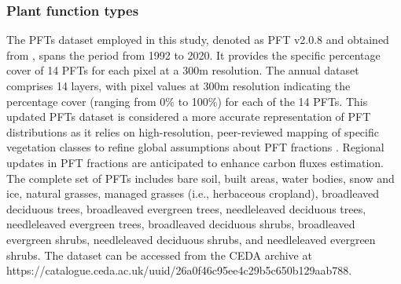 \subsubsection*{Plant function types}
The PFTs dataset employed in this study, denoted as PFT v2.0.8 and obtained from \citep{harper202229}, spans the period from 1992 to 2020. It provides the specific percentage cover of 14 PFTs for each pixel at a 300m resolution. The annual dataset comprises 14 layers, with pixel values at 300m resolution indicating the percentage cover (ranging from 0\% to 100\%) for each of the 14 PFTs. This updated PFTs dataset is considered a more accurate representation of PFT distributions as it relies on high-resolution, peer-reviewed mapping of specific vegetation classes to refine global assumptions about PFT fractions \citep{harper202229}. Regional updates in PFT fractions are anticipated to enhance carbon fluxes estimation. The complete set of PFTs includes bare soil, built areas, water bodies, snow and ice, natural grasses, managed grasses (i.e., herbaceous cropland), broadleaved deciduous trees, broadleaved evergreen trees, needleleaved deciduous trees, needleleaved evergreen trees, broadleaved deciduous shrubs, broadleaved evergreen shrubs, needleleaved deciduous shrubs, and needleleaved evergreen shrubs. The dataset can be accessed from the CEDA archive at https://catalogue.ceda.ac.uk/uuid/26a0f46c95ee4c29b5c650b129aab788.\par

